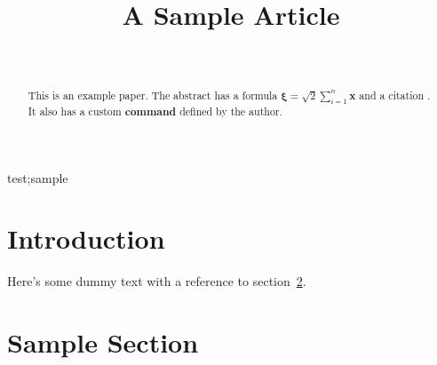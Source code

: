 \documentclass[wcp]{jmlr}
\author{\Name{Ann
Other}\Email{sample@nowhere.com}\\\addr{University of Nowhere}}
\title{A Sample Article}
\newcommand*{\boldstuff}[1]{\textbf{#1}}
\begin{document}
\maketitle

\begin{abstract}
This is an example paper. The abstract has a formula
$\boldsymbol{\xi} = \surd2 \sum_{i=1}^n \mathbf{x}$
and a citation \citep{smith2005}. It also has a custom
\boldstuff{command} defined by the author.
\end{abstract}
\begin{keywords}
test;sample
\end{keywords}

\section{Introduction}

Here's some dummy text with a reference to section~\ref{sec:sample}.

\section{Sample Section}
\label{sec:sample}


\end{document}
